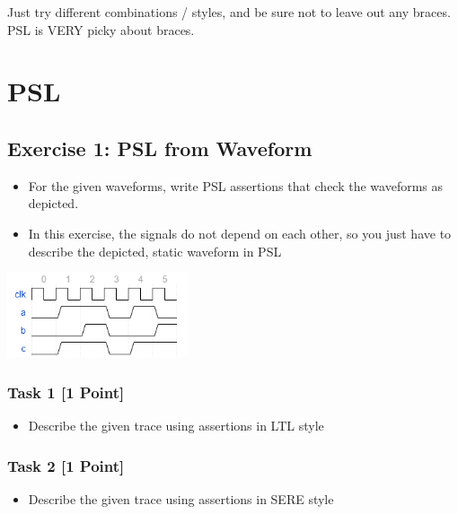 \documentclass[12pt,epsf,makeidx,oneside]{book}
\begin{document}
Just try different combinations / styles, and be sure not to leave out any braces. PSL is VERY picky about braces. 

\chapter{PSL}

\section{Exercise 1: PSL from Waveform}
\begin{itemize}
  \item For the given waveforms, write PSL assertions that check the waveforms as depicted.
  \item In this exercise, the signals do not depend on each other, so you just have to describe the depicted, static waveform in PSL
\end{itemize}
\begin{center}
  \includegraphics[width=0.4\textwidth]{ex1}
\end{center}

\subsection{Task 1 [1 Point]}
  \begin{itemize}
    \item Describe the given trace using assertions in LTL style
  \end{itemize}
 
\subsection{Task 2 [1 Point]}
  \begin{itemize}
    \item Describe the given trace using assertions in SERE style
  \end{itemize}
\end{document}
